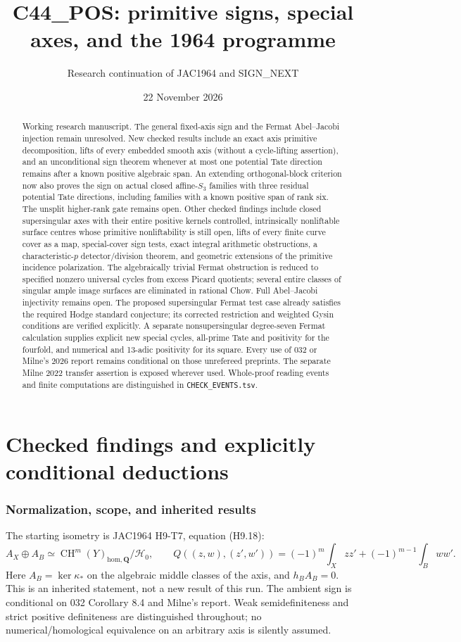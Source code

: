 \documentclass[11pt]{article}
\title{C44\_POS: primitive signs, special axes, and the 1964 programme}
\author{Research continuation of JAC1964 and SIGN\_NEXT}
\date{22 November 2026}
\theoremstyle{remark}\newtheorem{remark}[theorem]{Remark}
\DeclareMathOperator{\CH}{CH}
\newcommand{\Q}{\mathbf Q}\newcommand{\Z}{\mathbf Z}\newcommand{\F}{\mathbf F}
\begin{document}
\maketitle
\begin{abstract}
Working research manuscript. The general fixed-axis sign and the Fermat
Abel--Jacobi injection remain unresolved. New checked results include
an exact axis primitive decomposition, lifts of every embedded smooth
axis (without a cycle-lifting assertion), and an unconditional sign
theorem whenever at most one potential Tate direction remains after
a known positive algebraic span. An extending orthogonal-block criterion
now also proves the sign on actual closed affine-$S_3$ families with
three residual potential Tate directions, including families with a
known positive span of rank six. The unsplit higher-rank gate remains
open. Other
checked findings include closed supersingular axes with their entire
positive kernels controlled, intrinsically nonliftable surface centres
whose primitive nonliftability is still open, lifts of every finite
curve cover as a map, special-cover sign tests, exact integral
arithmetic obstructions, a characteristic-$p$ detector/division theorem,
and geometric extensions of the primitive incidence polarization.
The algebraically trivial Fermat obstruction is reduced to specified
nonzero universal cycles from excess Picard quotients; several entire
classes of singular ample image surfaces are eliminated in rational
Chow. Full Abel--Jacobi injectivity remains open.
The proposed supersingular Fermat test case already satisfies the
required Hodge standard conjecture; its corrected restriction and
weighted Gysin conditions are verified explicitly. A separate
nonsupersingular degree-seven Fermat calculation supplies explicit
new special cycles, all-prime Tate and positivity for the fourfold,
and numerical and 13-adic positivity for its square.
Every use of 032 or Milne's 2026 report remains conditional on those
unrefereed preprints. The separate Milne 2022 transfer assertion is
exposed wherever used. Whole-proof reading events and finite
computations are distinguished in \texttt{CHECK\_EVENTS.tsv}.
\end{abstract}
\tableofcontents
\part{Checked findings and explicitly conditional deductions}
\section{Normalization, scope, and inherited results}
The starting isometry is JAC1964 H9-T7, equation (H9.18):
\[
 A_X\oplus A_B\simeq\CH^m(Y)_{\mathrm{hom},\Q}/\mathcal H_0,
 \qquad Q((z,w),(z',w'))=(-1)^m\int_Xzz'+(-1)^{m-1}\int_Bww'.
\]
Here $A_B=\ker\kappa_*$ on the algebraic middle classes of the axis,
and $h_BA_B=0$. This is an inherited statement, not a new result of
this run. The ambient sign is conditional on 032 Corollary 8.4 and
Milne's report. Weak semidefiniteness and strict positive definiteness
are distinguished throughout; no numerical/homological equivalence
on an arbitrary axis is silently assumed.
\end{document}
